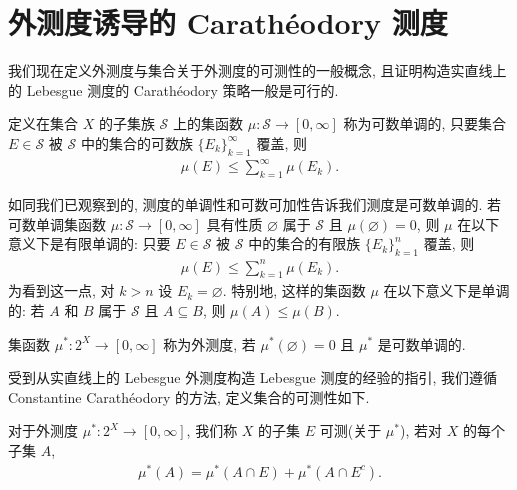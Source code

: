 \documentclass[../../main.tex]{subfiles}
\begin{document}
\section{外测度诱导的 Carath\'eodory 测度}\label{section:ch17-caratheodory}

我们现在定义外测度与集合关于外测度的可测性的一般概念, 且证明构造实直线上的 Lebesgue 测度的 Carath\'eodory 策略一般是可行的.

\begin{definition}[可数单调的集函数]\label{definition:ch17-countably-subadditive}
定义在集合 $X$ 的子集族 $\mathcal{S}$ 上的集函数 $\mu:\mathcal{S}\to[0,\infty]$ 称为可数单调的, 只要集合 $E\in\mathcal{S}$ 被 $\mathcal{S}$ 中的集合的可数族 $\{E_{k}\}_{k=1}^{\infty}$ 覆盖, 则
\begin{align*}
\mu(E)\leqslant\sum_{k=1}^{\infty}\mu(E_{k}).
\end{align*}
\end{definition}

如同我们已观察到的, 测度的单调性和可数可加性告诉我们测度是可数单调的. 若可数单调集函数 $\mu:\mathcal{S}\to[0,\infty]$ 具有性质 $\varnothing$ 属于 $\mathcal{S}$ 且 $\mu(\varnothing)=0$, 则 $\mu$ 在以下意义下是有限单调的: 只要 $E\in\mathcal{S}$ 被 $\mathcal{S}$ 中的集合的有限族 $\{E_{k}\}_{k=1}^{n}$ 覆盖, 则
\begin{align*}
\mu(E)\leqslant\sum_{k=1}^{n}\mu(E_{k}).
\end{align*}
为看到这一点, 对 $k>n$ 设 $E_{k}=\varnothing$. 特别地, 这样的集函数 $\mu$ 在以下意义下是单调的: 若 $A$ 和 $B$ 属于 $\mathcal{S}$ 且 $A\subseteq B$, 则 $\mu(A)\leqslant\mu(B)$.

\begin{definition}[外测度]\label{definition:ch17-outer-measure}
集函数 $\mu^*:2^{X}\to[0,\infty]$ 称为外测度, 若 $\mu^*(\varnothing)=0$ 且 $\mu^*$ 是可数单调的.
\end{definition}

受到从实直线上的 Lebesgue 外测度构造 Lebesgue 测度的经验的指引, 我们遵循 Constantine Carath\'eodory 的方法, 定义集合的可测性如下.

\begin{definition}\label{definition:ch17-caratheodory-measurable}
对于外测度 $\mu^*:2^{X}\to[0,\infty]$, 我们称 $X$ 的子集 $E$ 可测(关于 $\mu^*$), 若对 $X$ 的每个子集 $A$,
\begin{align*}
\mu^*(A)=\mu^*(A\cap E)+\mu^*(A\cap E^{c}).
\end{align*}
\end{definition}
\end{document}

